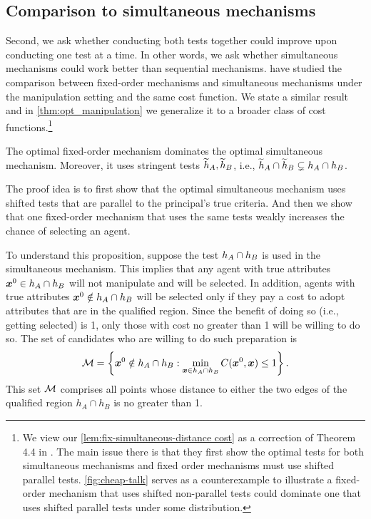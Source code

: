 \subsection{Comparison to simultaneous mechanisms}\label{subsec: simultaneous manipulation}
Second, we ask whether conducting both tests together could improve upon conducting one test at a time.
In other words, we ask whether simultaneous mechanisms could work better than sequential mechanisms.
\citet{zigzag} have studied the comparison between fixed-order mechanisms and simultaneous mechanisms under the manipulation setting and the same cost function.
 We state a similar result and in \cref{thm:opt_manipulation} we generalize it to a broader class of cost functions.\footnote{We view our \cref{lem:fix-simultaneous-distance cost} as a correction of Theorem 4.4 in \citet{zigzag}. 
The main issue there is that they first show the optimal tests for both simultaneous mechanisms and fixed order mechanisms must use shifted parallel tests.
\cref{fig:cheap-talk} serves as a counterexample to illustrate a fixed-order mechanism that uses shifted non-parallel tests could dominate one that uses shifted parallel tests under some distribution.
}
\begin{proposition}\label{lem:fix-simultaneous-distance cost}
    The optimal fixed-order mechanism dominates the optimal simultaneous mechanism. Moreover, it uses stringent tests $\widetilde{h}_A, \widetilde{h}_B$, i.e., $\widetilde{h}_A\cap \widetilde{h}_B \subsetneq h_A\cap h_B$.
\end{proposition}

The proof idea is to first show that the optimal simultaneous mechanism uses shifted tests that are parallel to the principal's true criteria.
And then we show that one fixed-order mechanism that uses the same tests weakly increases the chance of selecting an agent. 


To understand this proposition, suppose the test $h_{A} \cap h_{B}$ is used in the simultaneous mechanism. 
This implies that any agent with true attributes $\boldsymbol{x}^0\in h_{A} \cap h_{B}$
will not manipulate and will be selected. In addition, agents with true
attributes $\boldsymbol{x}^0\notin h_{A} \cap h_{B}$ will be selected only if they pay a
 cost to adopt attributes that are in the qualified region. Since
the benefit of doing so (i.e., getting selected) is 1, only those with cost
no greater than 1 will be willing to do so. The set of candidates who are
willing to do such preparation is 
\[
\mathcal{M}=\left\{ \boldsymbol{x}^0\notin h_{A}\cap h_{B}:\min_{\boldsymbol{x}\in h_{A}\cap
h_{B}}C(\boldsymbol{x}^0,\boldsymbol{x})\leq 1\right\} \text{.}
\]%
This set $\mathcal{M}$ comprises all points whose distance to either the two edges of
the qualified region $h_{A}\cap h_{B}$ is no greater than 1.

